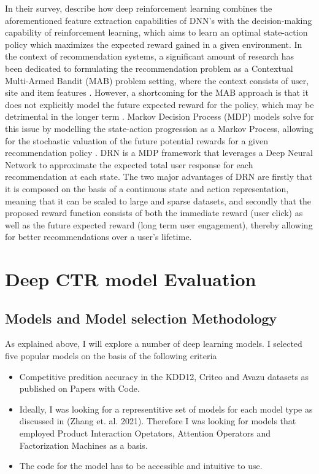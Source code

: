 \documentclass{mldsmsc}
\begin{document}
In their survey, \citep{RefWorks:wang2024deep} describe how deep reinforcement learning combines 
the aforementioned feature extraction capabilities of DNN’s with the decision-making 
capability of reinforcement learning, which aims to learn an optimal state-action policy 
which maximizes the expected reward gained in a given environment. In the context of 
recommendation systems, a significant amount of research has been dedicated to formulating 
the recommendation problem as a Contextual Multi-Armed Bandit (MAB) problem setting, where 
the context consists of user, site and item features \citep{RefWorks:bouneffouf2012contextual-bandit,RefWorks:li2010contextual-bandit,RefWorks:zeng2016online}. 
However, a shortcoming for the MAB approach 
is that it does not explicitly model the future expected reward for the policy, which may 
be detrimental in the longer term \citep{RefWorks:zheng2018drn:}. Markov Decision Process (MDP) models 
solve for this issue by modelling the state-action progression as a Markov Process, allowing 
for the stochastic valuation of the future potential rewards for a given recommendation 
policy \citep{RefWorks:lu2016partially,RefWorks:mahmood2007learning}. DRN \citep{RefWorks:zheng2018drn:} is a MDP framework 
that leverages a Deep Neural Network to approximate the expected total user response for 
each recommendation at each state. The two major advantages of DRN are firstly that it is 
composed on the basis of a continuous state and action representation, meaning that it can 
be scaled to large and sparse datasets, and secondly that the proposed reward function 
consists of both the immediate reward (user click) as well as the future expected reward 
(long term user engagement), thereby allowing for better recommendations over a user’s 
lifetime.

\chapter{Deep CTR model Evaluation}
\label{chap:deep-ctr-model-evaluation}

\section{Models and Model selection Methodology}

As explained above, I will explore a number of deep learning models. I selected five popular models on the basis of the following criteria

\begin{itemize}
\item Competitive predition accuracy in the KDD12, Criteo and Avazu datasets as published on Papers with Code.
\item Ideally, I was looking for a representitive set of models for each model type as discussed in (Zhang et. al. 2021). Therefore I was looking for models that employed Product Interaction Opetators, Attention Operators and Factorization Machines as a basis.
\item The code for the model has to be accessible and intuitive to use.
\end{itemize}
\end{document}
